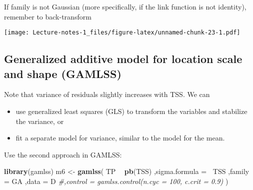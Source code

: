 \documentclass[
]{book}
\newenvironment{Shaded}{\begin{snugshade}}{\end{snugshade}}
\newcommand{\CommentTok}[1]{\textcolor[rgb]{0.56,0.35,0.01}{\textit{#1}}}
\newcommand{\DataTypeTok}[1]{\textcolor[rgb]{0.13,0.29,0.53}{#1}}
\newcommand{\DecValTok}[1]{\textcolor[rgb]{0.00,0.00,0.81}{#1}}
\newcommand{\KeywordTok}[1]{\textcolor[rgb]{0.13,0.29,0.53}{\textbf{#1}}}
\newcommand{\NormalTok}[1]{#1}
\newcommand{\OperatorTok}[1]{\textcolor[rgb]{0.81,0.36,0.00}{\textbf{#1}}}
\newcommand{\OtherTok}[1]{\textcolor[rgb]{0.56,0.35,0.01}{#1}}
\newcommand{\StringTok}[1]{\textcolor[rgb]{0.31,0.60,0.02}{#1}}
\providecommand{\tightlist}{%
  \setlength{\itemsep}{0pt}\setlength{\parskip}{0pt}}
\begin{document}
If family is not Gaussian (more specifically, if the link function is not identity), remember to back-transform

\begin{Shaded}
\end{Shaded}

\texttt{[image: Lecture-notes-1\_files/figure-latex/unnamed-chunk-23-1.pdf]}

\hypertarget{generalized-additive-model-for-location-scale-and-shape-gamlss-1}{%
\subsection{Generalized additive model for location scale and shape (GAMLSS)}\label{generalized-additive-model-for-location-scale-and-shape-gamlss-1}}

Note that variance of residuals slightly increases with TSS. We can

\begin{itemize}
\tightlist
\item
  use generalized least squares (GLS) to transform the variables and stabilize the variance, or
\item
  fit a separate model for variance, similar to the model for the mean.
\end{itemize}

Use the second approach in GAMLSS:

\begin{Shaded}
\begin{Highlighting}[]
\KeywordTok{library}\NormalTok{(gamlss)}
\NormalTok{m6 <-}\StringTok{ }\KeywordTok{gamlss}\NormalTok{(}
\NormalTok{  TP }\OperatorTok{~}\StringTok{ }\KeywordTok{pb}\NormalTok{(TSS)}
\NormalTok{  ,}\DataTypeTok{sigma.formula =} \OperatorTok{~}\NormalTok{TSS}
\NormalTok{  ,}\DataTypeTok{family =}\NormalTok{ GA}
\NormalTok{  ,}\DataTypeTok{data =}\NormalTok{ D}
  \CommentTok{#,control = gamlss.control(n.cyc = 100, c.crit = 0.9)}
\NormalTok{)}
\end{Highlighting}
\end{Shaded}
\end{document}
